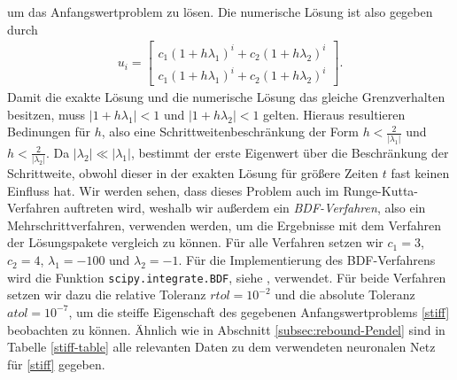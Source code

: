 um das Anfangswertproblem zu lösen. Die numerische Lösung ist also gegeben durch
\begin{align*}
       u_{i}=
       \begin{bmatrix}
              c_1 (1+h\lambda_1)^{i} + c_2 (1+h\lambda_2)^{i}\\
              c_1 (1+h\lambda_1)^{i} + c_2 (1+h\lambda_2)^{i}
       \end{bmatrix}.
\end{align*}
Damit die exakte Lösung und die numerische Lösung das gleiche Grenzverhalten besitzen, muss $|1 + h\lambda_1|<1$ und
$|1 + h\lambda_2|<1$ gelten. Hieraus resultieren Bedinungen für $h$, also eine Schrittweitenbeschränkung der Form
$h<\frac{2}{|\lambda_1|}$ und $h<\frac{2}{|\lambda_2|}$. Da $|\lambda_2| \ll |\lambda_1|$, bestimmt der erste Eigenwert
über die Beschränkung der Schrittweite, obwohl dieser in der exakten Lösung für größere Zeiten $t$ fast keinen Einfluss
hat. Wir werden sehen, dass dieses Problem auch im Runge-Kutta-Verfahren auftreten wird, weshalb wir außerdem ein
\textit{BDF-Verfahren}, also ein Mehrschrittverfahren, verwenden werden, um die Ergebnisse mit dem Verfahren der
Lösungspakete vergleich zu können. Für alle Verfahren setzen wir $c_1=3$, $c_2=4$, $\lambda_1 = -100$ und $\lambda_2=-1$.
Für die Implementierung des BDF-Verfahrens wird die Funktion \texttt{scipy.integrate.BDF}, siehe
\cite{ScipyIntegrateBDF}, verwendet. Für beide Verfahren setzen wir dazu die relative Toleranz $rtol=10^{-2}$ und die
absolute Toleranz $atol=10^{-7}$, um die steiffe Eigenschaft des gegebenen Anfangswertproblems \eqref{stiff} beobachten
zu können. Ähnlich wie in Abschnitt \ref{subsec:rebound-Pendel} sind in Tabelle \ref{stiff-table} alle relevanten Daten
zu dem verwendeten neuronalen Netz für \eqref{stiff} gegeben.

